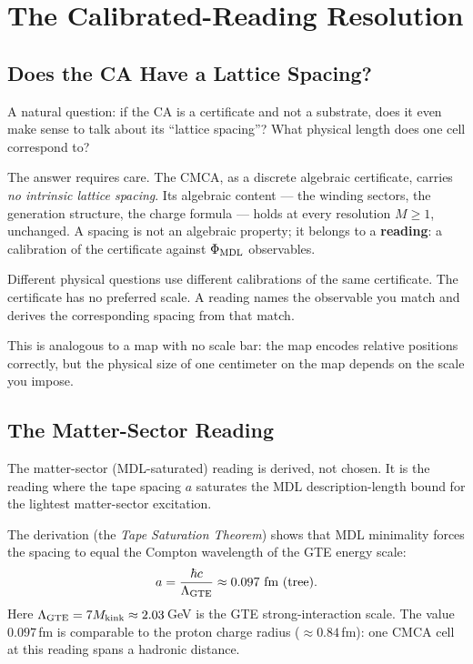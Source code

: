 \documentclass[11pt,a4paper]{article}
\newcommand{\term}[1]{\textbf{#1}}
\newcommand{\PhiMDL}{\Phi_{\rm MDL}}
\newcommand{\Mkink}{M_{\rm kink}}
\theoremstyle{definition}
\begin{document}
\section{The Calibrated-Reading Resolution}
\label{sec:reading}

\subsection{Does the CA Have a Lattice Spacing?}

A natural question: if the CA is a certificate and not a substrate, does it
even make sense to talk about its ``lattice spacing''?  What physical length
does one cell correspond to?

The answer requires care.  The CMCA, as a discrete algebraic certificate,
carries \emph{no intrinsic lattice spacing}.  Its algebraic content ---
the winding sectors, the generation structure, the charge formula --- holds
at every resolution $M \geq 1$, unchanged.
A spacing is not an algebraic property; it belongs to a \term{reading}: a
calibration of the certificate against $\PhiMDL$ observables.

\begin{tcolorbox}[colback=boxteal,colframe=teal!50!black,
  title={Readings: calibrations, not intrinsic properties}]
Different physical questions use different calibrations of the same certificate.
The certificate has no preferred scale.  A reading names the observable you match
and derives the corresponding spacing from that match.

This is analogous to a map with no scale bar: the map encodes relative positions
correctly, but the physical size of one centimeter on the map depends on the scale
you impose.
\end{tcolorbox}

\subsection{The Matter-Sector Reading}

The matter-sector (MDL-saturated) reading is derived, not chosen.  It is the reading
where the tape spacing $a$ saturates the MDL description-length bound for the
lightest matter-sector excitation.

The derivation (the \emph{Tape Saturation Theorem}) shows that MDL minimality
forces the spacing to equal the Compton wavelength of the GTE energy scale:
\[
  a = \frac{\hbar c}{\Lambda_{\rm GTE}} \approx 0.097\text{ fm (tree)}.
\]
Here $\Lambda_{\rm GTE} = 7\Mkink \approx 2.03$\,GeV is the GTE strong-interaction
scale.  The value $0.097$\,fm is comparable to the proton charge radius
($\approx 0.84$\,fm): one CMCA cell at this reading spans a hadronic distance.
\end{document}
